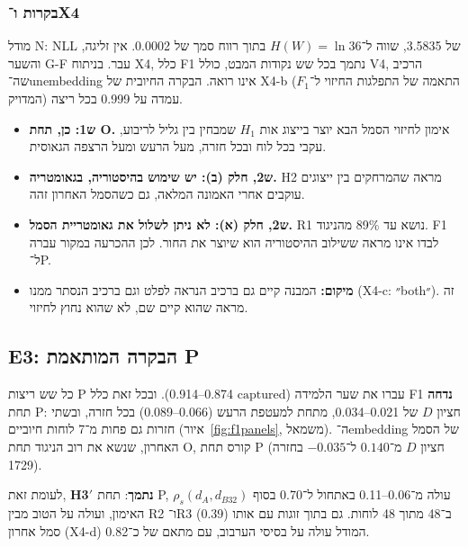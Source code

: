 \documentclass[12pt,a4paper]{article}
\newcommand{\en}[1]{\foreignlanguage{english}{#1}}   %
\begin{document}
\subsubsection{בקרות ו־\en{X4}}
מודל N: \en{NLL} של 3.5835, שווה ל־$H(W)=\ln 36$ בתוך רווח סמך של 0.0002. אין זליגה, והשער \en{G-F} עבר. בניתוח \en{X4}, כלל F1 נתמך בכל שש נקודות המבט, כולל V4, הרכיב שה־\en{unembedding} אינו רואה. הבקרה החיובית של \en{X4-b} (התאמה של התפלגות החיזוי ל־$F_1$ המדויק) עמדה על 0.999 בכל ריצה.

\begin{meaningbox}
\begin{itemize}[leftmargin=*]
\item \textbf{ש1: כן, תחת O.} אימון לחיזוי הסמל הבא יוצר בייצוג אות $H_1$ שמבחין בין גליל לריבוע, עקבי בכל לוח ובכל חזרה, מעל הרעש ומעל הרצפה הגאוסית.
\item \textbf{ש2, חלק (ב): יש שימוש בהיסטוריה, בגאומטריה.} H2 מראה שהמרחקים בין ייצוגים עוקבים אחרי האמונה המלאה, גם כשהסמל האחרון זהה.
\item \textbf{ש2, חלק (א): לא ניתן לשלול את גאומטריית הסמל.} R1 נושא עד 89\% מהניגוד. F1 לבדו אינו מראה ששילוב ההיסטוריה הוא שיוצר את החור. לכן ההכרעה במקור עברה ל־P.
\item \textbf{מיקום:} המבנה קיים גם ברכיב הנראה לפלט וגם ברכיב הנסתר ממנו (\en{X4-c}: ״\en{both}״). זה מראה שהוא קיים שם, לא שהוא נחוץ לחיזוי.
\end{itemize}
\end{meaningbox}

\subsection{\en{E3}: הבקרה המותאמת P}\label{sec:e3p}
כל שש ריצות P עברו את שער הלמידה ($\mathrm{captured}$ 0.874–0.914). ובכל זאת כלל F1 \textbf{נדחה} תחת P: חציון $D$ של 0.021–0.034, מתחת למעטפת הרעש (0.066–0.089) בכל חזרה, ובשתי חזרות גם פחות מ־7 לוחות חיוביים (איור~\ref{fig:f1panels}, משמאל). ה־\en{embedding} של הסמל האחרון, שנשא את רוב הניגוד תחת O, קורס תחת P (חציון $D$ מ־$0.140$ ל־$-0.035$ בחזרה 1729).

לעומת זאת, \textbf{H3$'$ נתמך}: תחת P, $\rho_s(d_A,d_{B32})$ עולה מ־0.06–0.11 באתחול ל־0.70 בסוף האימון, ועולה על הטוב מבין R2 ו־R3 (0.39) ב־48 מתוך 48 לוחות. גם בתוך זוגות עם אותו סמל אחרון (\en{X4-d}) המודל עולה על בסיסי הערבוב, עם מתאם של כ־0.82.
\end{document}
